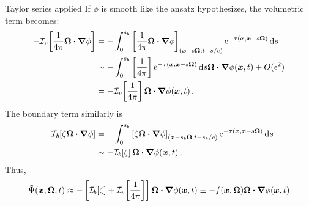 \documentclass{beamer}
\begin{document}
\begin{frame}{Taylor series applied}
  If $\phi$ is smooth like the ansatz hypothesizes, the volumetric term becomes:
  \begin{align} \nonumber
  -\mathcal{I}_{v}\!\left[ \frac{1}{4\pi} \bm{\Omega}\bm{\cdot} \bm{\nabla} \phi \right]
  &= -\int_{0}^{s_b}
    \left[ \frac{1}{4\pi} \bm{\Omega}\bm{\cdot} \bm{\nabla} \phi \right]_{(\bm{x} - s
    \bm{\Omega}, t-s/c)}
    \mathop{}\!\mathrm{e}^{ -\tau(\bm{x}, \bm{x} - s \bm{\Omega})}
    \mathop{}\!\mathrm{d} s
  \\\nonumber
  &\sim - \int_{0}^{s_b}
    \left[ \frac1{4\pi}\right]
    \mathop{}\!\mathrm{e}^{ -\tau(\bm{x}, \bm{x} - s \bm{\Omega})} \mathop{}\!\mathrm{d} s
    \bm{\Omega}\bm{\cdot} \bm{\nabla} \phi(\bm{x},t) + O(\epsilon^2)
  \\\label{eq:tildeS}
  &= - \mathcal{I}_{v}\!\left[ \frac1{4\pi} \right] \bm{\Omega}\bm{\cdot} \bm{\nabla} \phi(\bm{x},t)\,.
  \end{align}
  The boundary term similarly is
  \begin{align} \nonumber
  - \mathcal{I}_{b}\!\left[ \zeta \bm{\Omega}\bm{\cdot} \bm{\nabla} \phi \right]
  &= -\int_{0}^{s_b}
    \left[\zeta \bm{\Omega}\bm{\cdot} \bm{\nabla} \phi \right]_{(\bm{x} - s_b
    \bm{\Omega}, t-s_b/c)}
    \mathop{}\!\mathrm{e}^{ -\tau(\bm{x}, \bm{x} - s \bm{\Omega})}
    \mathop{}\!\mathrm{d} s
  \\ \label{eq:tildeB}
  &\sim - \mathcal{I}_{b}\!\left[ \zeta \right]
  \bm{\Omega}\bm{\cdot} \bm{\nabla} \phi(\bm{x},t)\,.
  \end{align}
  Thus,
  \begin{equation}\label{eq:capPsiApprox}
    \tilde\Psi(\bm{x}, \bm{\Omega}, t) \approx
    - \left[ \mathcal{I}_{b}\!\left[ \zeta \right]
    + \mathcal{I}_{v}\!\left[ \frac1{4\pi} \right] \right]
    \bm{\Omega}\bm{\cdot} \bm{\nabla} \phi(\bm{x},t)
    \equiv -f(\bm{x}, \bm{\Omega}) \bm{\Omega}\bm{\cdot} \bm{\nabla} \phi(\bm{x},t)
  \end{equation}
\end{frame}
\end{document}
